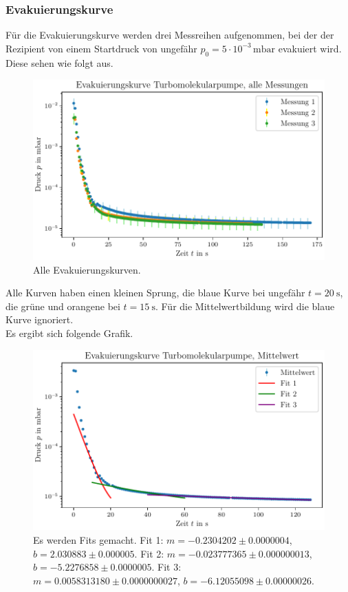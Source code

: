 \subsubsection{Evakuierungskurve}
Für die Evakuierungskurve werden drei Messreihen aufgenommen, bei der der Rezipient von einem Startdruck von ungefähr $p_0 = \num{5} \cdot 10^{-3} \, \si{\milli\bar}$ evakuiert wird.
Diese sehen wie folgt aus.

\begin{figure}[H]
    \centering
    \includegraphics[width=\textwidth]{plots/TP_Evakuierungskurve_alle.pdf}
    \caption{Alle Evakuierungskurven.}
    \label{fig:TP_evak_alle}
\end{figure}

Alle Kurven haben einen kleinen Sprung, die blaue Kurve bei ungefähr $t = \SI{20}{\second}$, die grüne und orangene bei $t = \SI{15}{\second}$.
Für die Mittelwertbildung wird die blaue Kurve ignoriert. \\
Es ergibt sich folgende Grafik.

\begin{figure}[H]
    \centering
    \includegraphics[width=\textwidth]{plots/TP_Evakuierungskurve.pdf}
    \caption{Es werden Fits gemacht. Fit 1: $m = \num{-0.2304202} \pm \num{0.0000004}$, $b = \num{2.030883} \pm \num{0.000005}$. Fit 2: $m = \num{-0.023777365} \pm \num{0.000000013}$, $b = \num{-5.2276858} \pm \num{0.0000005}$. Fit 3: $m = \num{0.0058313180} \pm \num{0.0000000027}$, $b = \num{-6.12055098} \pm \num{0.00000026}$.}
    \label{fig:TP_evak}
\end{figure}

